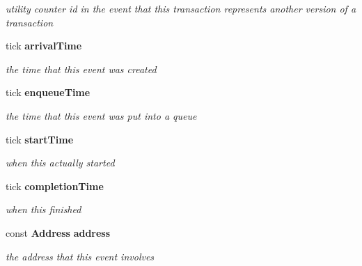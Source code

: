 \begin{CompactItemize}
\begin{CompactList}\small\item\em utility counter id in the event that this transaction represents another version of a transaction \item\end{CompactList}\item 
tick {\bf arrivalTime}\label{class_d_r_a_msim_i_i_1_1_event_5eae270c205a02b2fb28d11ab84a6ed9}

\begin{CompactList}\small\item\em the time that this event was created \item\end{CompactList}\item 
tick {\bf enqueueTime}\label{class_d_r_a_msim_i_i_1_1_event_55cd17fa82ce4031824037df59dc50d3}

\begin{CompactList}\small\item\em the time that this event was put into a queue \item\end{CompactList}\item 
tick {\bf startTime}\label{class_d_r_a_msim_i_i_1_1_event_9f6b444813bf6568040678e0d8139d44}

\begin{CompactList}\small\item\em when this actually started \item\end{CompactList}\item 
tick {\bf completionTime}\label{class_d_r_a_msim_i_i_1_1_event_2a6e865d555bcde6264e8726edc95b38}

\begin{CompactList}\small\item\em when this finished \item\end{CompactList}\item 
const {\bf Address} {\bf address}\label{class_d_r_a_msim_i_i_1_1_event_6aa0830ccf3c9f103bc6dfaab1919562}

\begin{CompactList}\small\item\em the address that this event involves \item\end{CompactList}\end{CompactItemize}
